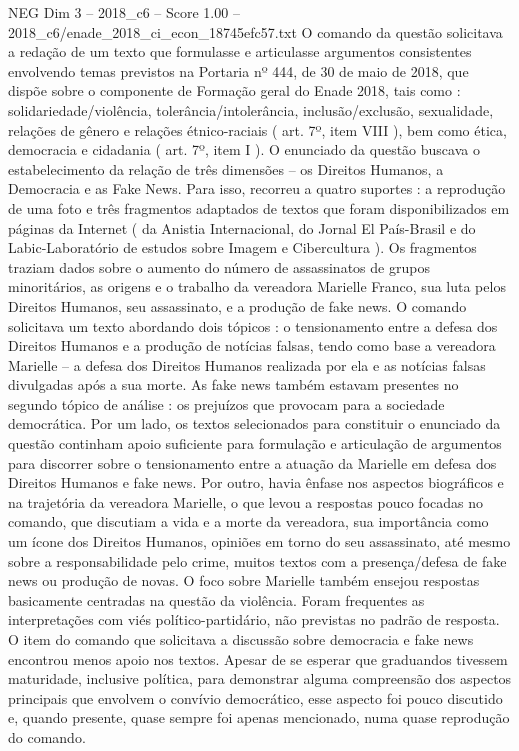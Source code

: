 \begin{textsample}{NEG Dim 3 – 2018\_c6 – Score 1.00 – 2018\_c6/enade\_2018\_ci\_econ\_18745efc57.txt}
O comando da questão solicitava a redação de um texto que formulasse e articulasse argumentos consistentes envolvendo temas previstos na Portaria nº 444, de 30 de maio de 2018, que dispõe sobre o componente de Formação geral do Enade 2018, tais como : solidariedade/violência, tolerância/intolerância, inclusão/exclusão, sexualidade, relações de gênero e relações étnico-raciais ( art. 7º, item VIII ), bem como ética, democracia e cidadania ( art. 7º, item I ).
O enunciado da questão buscava o estabelecimento da relação de três dimensões – os Direitos Humanos, a Democracia e as Fake News.
Para isso, recorreu a quatro suportes : a reprodução de uma foto e três fragmentos adaptados de textos que foram disponibilizados em páginas da Internet ( da Anistia Internacional, do Jornal El País-Brasil e do Labic-Laboratório de estudos sobre Imagem e Cibercultura ).
Os fragmentos traziam dados sobre o aumento do número de assassinatos de grupos minoritários, as origens e o trabalho da vereadora Marielle Franco, sua luta pelos Direitos Humanos, seu assassinato, e a produção de fake news.
O comando solicitava um texto abordando dois tópicos : o tensionamento entre a defesa dos Direitos Humanos e a produção de notícias falsas, tendo como base a vereadora Marielle – a defesa dos Direitos Humanos realizada por ela e as notícias falsas divulgadas após a sua morte.
As fake news também estavam presentes no segundo tópico de análise : os prejuízos que provocam para a sociedade democrática.
Por um lado, os textos selecionados para constituir o enunciado da questão continham apoio suficiente para formulação e articulação de argumentos para discorrer sobre o tensionamento entre a atuação da Marielle em defesa dos Direitos Humanos e fake news.
Por outro, havia ênfase nos aspectos biográficos e na trajetória da vereadora Marielle, o que levou a respostas pouco focadas no comando, que discutiam a vida e a morte da vereadora, sua importância como um ícone dos Direitos Humanos, opiniões em torno do seu assassinato, até mesmo sobre a responsabilidade pelo crime, muitos textos com a presença/defesa de fake news ou produção de novas.
O foco sobre Marielle também ensejou respostas basicamente centradas na questão da violência.
Foram frequentes as interpretações com viés político-partidário, não previstas no padrão de resposta.
O item do comando que solicitava a discussão sobre democracia e fake news encontrou menos apoio nos textos.
Apesar de se esperar que graduandos tivessem maturidade, inclusive política, para demonstrar alguma compreensão dos aspectos principais que envolvem o convívio democrático, esse aspecto foi pouco discutido e, quando presente, quase sempre foi apenas mencionado, numa quase reprodução do comando.

\end{textsample}
